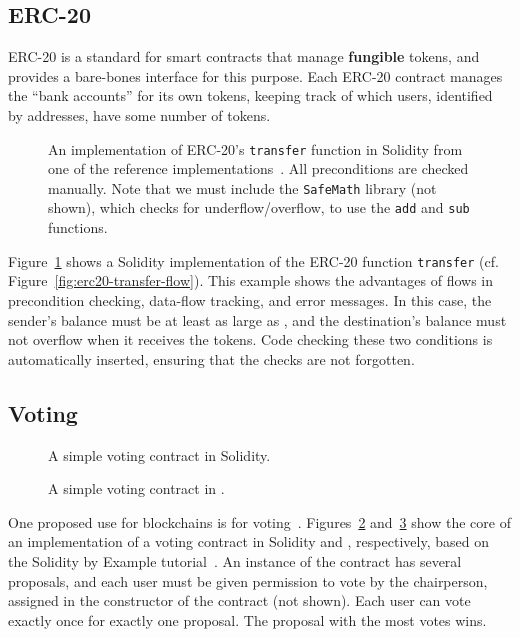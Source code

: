 \documentclass[nonacm, dvipsnames, usenames, sigconf]{acmart}
\begin{document}
\subsection{ERC-20}\label{sec:erc20-impl}
ERC-20 is a standard for smart contracts that manage \textbf{fungible} tokens, and provides a bare-bones interface for this purpose.
Each ERC-20 contract manages the ``bank accounts'' for its own tokens, keeping track of which users, identified by addresses, have some number of tokens.
\begin{figure}
    \centering
    
    \caption{An implementation of ERC-20's \lstinline{transfer} function in Solidity from one of the reference implementations~\cite{erc20Consensys}.
        All preconditions are checked manually.
        Note that we must include the \lstinline{SafeMath} library (not shown), which checks for underflow/overflow, to use the \lstinline{add} and \lstinline{sub} functions.}
    \label{fig:erc20-transfer-sol}
\end{figure}
Figure~\ref{fig:erc20-transfer-sol} shows a Solidity implementation of the ERC-20 function \lstinline{transfer} (cf. Figure~\ref{fig:erc20-transfer-flow}).
This example shows the advantages of flows in precondition checking, data-flow tracking, and error messages.
In this case, the sender's balance must be at least as large as , and the destination's balance must not overflow when it receives the tokens.
Code checking these two conditions is automatically inserted, ensuring that the checks are not forgotten.

\subsection{Voting}\label{sec:voting-impl}
\begin{figure}
    \centering
    
    \caption{A simple voting contract in Solidity.}
    \label{fig:voting-impl-sol}
\end{figure}%
\begin{figure}
    \centering
    
    \caption{A simple voting contract in \langName.}
    \label{fig:voting-impl-flow}
\end{figure}
One proposed use for blockchains is for voting~\cite{Elsden18:Making}.
Figures~\ref{fig:voting-impl-sol} and~\ref{fig:voting-impl-flow} show the core of an implementation of a voting contract in Solidity and \langName, respectively, based on the Solidity by Example tutorial~\cite{solidityByExample}.
An instance of the contract has several proposals, and each user must be given permission to vote by the chairperson, assigned in the constructor of the contract (not shown).
Each user can vote exactly once for exactly one proposal.
The proposal with the most votes wins.
\end{document}
